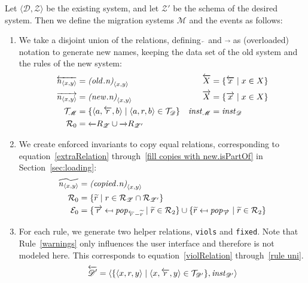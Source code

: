 \documentclass[runningheads]{llncs}
\newcommand{\id}[1]{\text{\it #1\/}}
\newcommand{\popF}[1]{\id{pop}_{#1}}
\newcommand{\instance}{\mathbin{\id{inst}}}
\newcommand{\declare}[3]{\id{#1}_{\pair{#2}{#3}}}
\newcommand{\pair}[2]{\langle{#1},{#2}\rangle}
\newcommand{\triple}[3]{\langle{#1},{#2},{#3}\rangle}
\newcommand{\rels}{\mathcal{R}}   %
\newcommand{\triples}{\mathcal{T}}
\newcommand{\enforces}{\mathcal{E}}
\newcommand{\rules}{\mathcal{U}}
\newcommand{\dataset}{\mathscr{D}}
\newcommand{\schema}{\mathscr{Z}}
\newcommand{\migrsys}{\mathscr{M}}
\begin{document}
   Let $\pair{\dataset}{\schema}$ be the existing system, and let ${\schema'}$ be the schema of the desired system.
   Then we define the migration systems $\migrsys$ and the events as follows:
\begin{enumerate}
\item We take a disjoint union of the relations, defining $\overleftarrow~$ and $\overrightarrow~$ as (overloaded) notation to generate new names, keeping the data set of the old system and the rules of the new system:
   \begin{align}
   \overleftarrow{\declare{n}{x}{y}}&=\declare{(\id{old}.n)}{x}{y}&\overleftarrow{X} &= \{\overleftarrow{x}\mid x\in X\}\\
   \overrightarrow{\declare{n}{x}{y}}&=\declare{(\id{new}.n)}{x}{y}& \overrightarrow{X} &= \{\overrightarrow{x}\mid x\in X\}\\
   \triples_\migrsys &= \{\triple{a}{\overleftarrow{r}}{b} \mid \triple{a}{r}{b}\in\triples_\dataset\}&
   \instance_\migrsys &= \instance_\dataset\\
   \rels_\theenumi &= \overleftarrow\rels_{\schema} \cup \overrightarrow\rels_{\schema'}
   \end{align}
\item We create enforced invariants to copy equal relations, corresponding to equation~\ref{extraRelation} through~\ref{fill copies with new.isPartOf} in Section~\ref{sec:loading}:
   \begin{align}
   \widetilde{\declare{n}{x}{y}} &= \declare{(\id{copied}.n)}{x}{y}\\
   \rels_\theenumi &= \{\widetilde{r}\mid r \in \rels_\schema \cap \rels_{\schema'}\}\\
   \enforces_\theenumi &= \{\overrightarrow{r}\mapsfrom \popF{\overleftarrow{r} - \widetilde{r}} \mid \widetilde{r} \in \rels_2\} \cup \{\widetilde{r}\mapsfrom \popF{\overrightarrow{r}} \mid \widetilde{r} \in \rels_2\}
   \end{align}
\item For each rule, we generate two helper relations, {\tt viols} and {\tt fixed}. Note that Rule~\ref{warnings} only influences the user interface and therefore is not modeled here. This corresponds to equation~\ref{violRelation} through~\ref{rule uni}.
   \begin{align}
   \overleftarrow{\dataset'} &= \pair{\{\triple{x}{{r}}{y}\mid \triple{x}{\overleftarrow{r}}{y} \in \triples_{\dataset'}\}}{\instance_{\dataset'}}\\

\end{align}
\end{enumerate}
\end{document}
